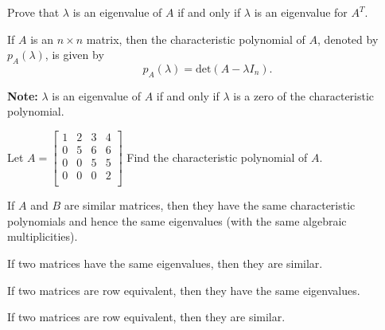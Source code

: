 \documentclass[12pt,letterpaper]{article}
\begin{document}
\begin{enumerate}
\vfill

\newpage

\Problem Prove that $\lambda$ is an eigenvalue of $A$ if and only if $\lambda$ is an eigenvalue for $A^{T}$.

\vfill

\begin{defn} If $A$ is an $n\times n$ matrix, then the characteristic polynomial of $A$, denoted by $p_A(\lambda)$, is given by $$p_A(\lambda)=\text{det}(A-\lambda I_n).$$
\end{defn}

{\bf Note:} $\lambda$ is an eigenvalue of $A$ if and only if $\lambda$ is a zero of the characteristic polynomial.

\Problem Let $A=\begin{bmatrix} 1 & 2 & 3 & 4\\ 
0 & 5 & 6 & 6\\
0 & 0 & 5 & 5\\
0 & 0 & 0 & 2\\
\end{bmatrix}$ Find the characteristic polynomial of $A$.

\vfill 

\newpage

\Problem If $A$ and $B$ are similar matrices, then they have the same characteristic polynomials and hence the same eigenvalues (with the same algebraic multiplicities). 

\vfill


\Part If two matrices have the same eigenvalues, then they are similar.

\vfill

\Part If two matrices are row equivalent, then they have the same eigenvalues.

\vfill

\Part If two matrices are row equivalent, then they are similar.

\vfill

\end{enumerate}
\end{document}
